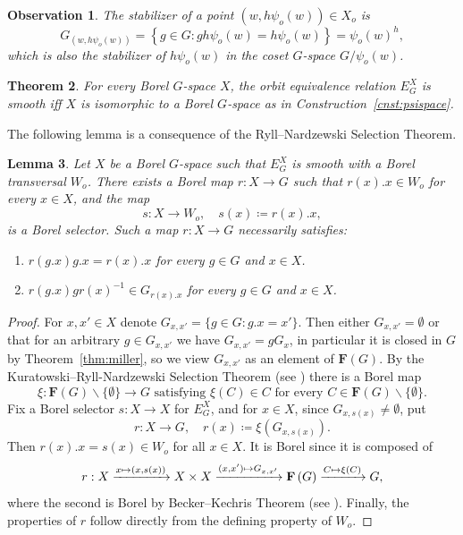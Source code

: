 \documentclass{amsart}
\numberwithin{equation}{subsection}
\newtheorem{thm}{Theorem}[section]
\newtheorem{lem}[thm]{Lemma}
\newtheorem{obs}[thm]{Observation}
\begin{document}
\begin{obs}
\label{obs:stab}
The stabilizer of a point \(\left(w,h\psi_{o}\left(w\right)\right)\in X_{o}\) is
\[G_{\left(w,h\psi_{o}\left(w\right)\right)}=\left\{ g\in G:gh\psi_{o}\left(w\right)=h\psi_{o}\left(w\right)\right\}=\psi_{o}\left(w\right)^{h},\]
which is also the stabilizer of \(h\psi_{o}\left(w\right)\) in the coset \(G\)-space \( G/\psi_{o}\left(w\right)\).
\end{obs}

\begin{thm}
\label{thm:smoothactions}
For every Borel \(G\)-space \(X\), the orbit equivalence relation \(E_{G}^{X}\) is smooth iff \(X\) is isomorphic to a Borel \(G\)-space as in Construction~\ref{cnst:psispace}.
\end{thm}

The following lemma is a consequence of the Ryll--Nardzewski Selection Theorem.

\begin{lem}
\label{lem:grpselect}
Let \(X\) be a Borel \(G\)-space such that \(E_{G}^{X}\) is smooth with a Borel transversal \(W_{o}\). There exists a Borel map \(r:X\to G\) such that \(r\left(x\right).x\in W_{o}\) for every \(x\in X\), and the map
\[s:X\to W_{o},\quad s\left(x\right)\coloneqq r\left(x\right).x,\]
is a Borel selector. Such a map \(r:X\rightarrow G\) necessarily satisfies:
\begin{enumerate}
    \item \(r\left(g.x\right)g.x=r\left(x\right).x\) for every \(g\in G\) and \(x\in X\).
    \item \(r\left(g.x\right)gr\left(x\right)^{-1}\in G_{r\left(x\right).x}\) for every \(g\in G\) and \(x\in X\).
\end{enumerate} 
\end{lem}

\begin{proof}
For \(x,x'\in X\) denote \(G_{x,x'}=\{g\in G:g.x=x'\}\). Then either \(G_{x,x'}=\emptyset\) or that for an arbitrary \(g\in G_{x,x'}\) we have \(G_{x,x'}=gG_{x}\), in particular it is closed in \(G\) by Theorem~\ref{thm:miller}, so we view \(G_{x,x'}\) as an element of \(\mathbf{F}\left(G\right)\). By the Kuratowski--Ryll-Nardzewski Selection Theorem (see \cite[Theorem 1.4.6]{gao2008invariant}) there is a Borel map 
\[\xi:\mathbf{F}\left(G\right)\backslash\{\emptyset\}\to G\text{ satisfying }\xi\left(C\right)\in C\text{ for every }C\in \mathbf{F}\left(G\right)\backslash\{\emptyset\}.\]
Fix a Borel selector \(s:X\to X\) for \(E_{G}^{X}\), and for \(x\in X\), since \(G_{x,s\left(x\right)}\neq\emptyset\), put
\[r:X\to G,\quad r\left(x\right)\coloneqq\xi\left(G_{x,s\left(x\right)}\right).\]
Then \(r\left(x\right).x=s\left(x\right)\in W_{o}\) for all \(x\in X\). It is Borel since it is composed of
\[r:X\xrightarrow{x\mapsto\left(x,s\left(x\right)\right)}X\times X\xrightarrow{\small(x,x'\small)\mapsto G_{x,x'}}\mathbf{F}\left(G\right)\xrightarrow{C\mapsto\xi\left(C\right)}G,\]
where the second is Borel by Becker--Kechris Theorem (see \cite[Theorem 8.2.1]{gao2008invariant}). Finally, the properties of \(r\) follow directly from the defining property of \(W_{o}\).
\end{proof}
\end{document}
